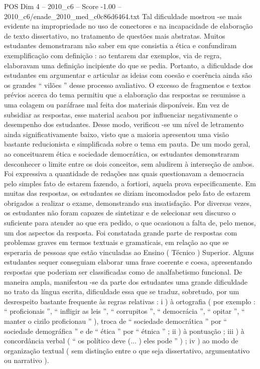 \begin{textsample}{POS Dim 4 – 2010\_c6 – Score -1.00 – 2010\_c6/enade\_2010\_med\_c0c86d6464.txt}
Tal dificuldade mostrou -se mais evidente na impropriedade no uso de conectores e na incapacidade de elaboração de texto dissertativo, no tratamento de questões mais abstratas.
Muitos estudantes demonstraram não saber em que consistia a ética e confundiram exemplificação com definição : ao tentarem dar exemplos, via de regra, elaboravam uma definição incipiente do que se pedia.
Portanto, a dificuldade dos estudantes em argumentar e articular as ideias com coesão e coerência ainda são os grandes “ vilões ” desse processo avaliativo.
O excesso de fragmentos e textos prévios acerca do tema permitiu que a elaboração das respostas se resumisse a uma colagem ou paráfrase mal feita dos materiais disponíveis.
Em vez de subsidiar as respostas, esse material acabou por influenciar negativamente o desempenho dos estudantes.
Desse modo, verificou -se um nível de letramento ainda significativamente baixo, visto que a maioria apresentou uma visão bastante reducionista e simplificada sobre o tema em pauta.
De um modo geral, ao conceituarem ética e sociedade democrática, os estudantes demonstraram desconhecer o limite entre os dois conceitos, sem aludirem à interseção de ambos.
Foi expressiva a quantidade de redações nas quais questionavam a democracia pelo simples fato de estarem fazendo, a fortiori, aquela prova especificamente.
Em muitas das respostas, os estudantes se diziam incomodados pelo fato de estarem obrigados a realizar o exame, demonstrando sua insatisfação.
Por diversas vezes, os estudantes não foram capazes de sintetizar e de selecionar seu discurso o suficiente para atender ao que era pedido, o que ocasionou a falta de, pelo menos, um dos aspectos da resposta.
Foi constatada grande parte de respostas com problemas graves em termos textuais e gramaticais, em relação ao que se esperaria de pessoas que estão vinculadas ao Ensino ( Técnico ) Superior.
Alguns estudantes sequer conseguiam elaborar uma frase coerente e coesa, apresentando respostas que poderiam ser classificadas como de analfabetismo funcional.
De maneira ampla, manifestou -se da parte dos estudantes uma grande dificuldade no trato da língua escrita, dificuldade essa que se traduz, sobretudo, por um desrespeito bastante frequente às regras relativas : i ) à ortografia ( por exemplo : “ proficionais ”, “ infligir as leis ”, “ corrupitos ”, “ democrácia ”, “ opitar ”, “ manter o cizilo proficionau ” ), troca de “ sociedade democrática ” por “ sociedade demográfica ” e de “ ética ” por “ étnica ” ; ii ) à pontuação ; iii ) à concordância verbal ( “ os político deve (... ) eles pode ” ) ; iv ) ao modo de organização textual ( sem distinção entre o que seja dissertativo, argumentativo ou narrativo ).

\end{textsample}
